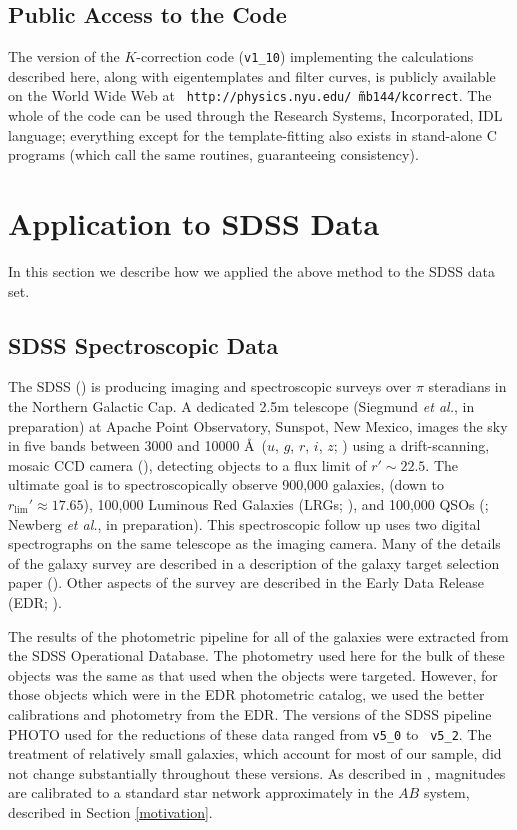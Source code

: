 \documentclass[10pt,preprint]{aastex}
\newcommand{\kversion}{{\tt v1\_10}}
\begin{document}
\subsection{Public Access to the Code}

The version of the $K$-correction code (\kversion) implementing the
calculations described here, along with eigentemplates and filter
curves, is publicly available on the World Wide Web at {\tt
http://physics.nyu.edu/\~\ mb144/kcorrect}.  The whole of the code can
be used through the Research Systems, Incorporated, IDL language;
everything except for the template-fitting also exists in stand-alone
C programs (which call the same routines, guaranteeing consistency).

\section{Application to SDSS Data}
\label{data}

In this section we describe how we applied the above method to the
SDSS data set.

\subsection{SDSS Spectroscopic Data}

The SDSS (\citealt{york00a}) is producing imaging and spectroscopic
surveys over $\pi$ steradians in the Northern Galactic Cap. A
dedicated 2.5m telescope (Siegmund {\it et al.}, in preparation) at
Apache Point Observatory, Sunspot, New Mexico, images the sky in five
bands between 3000 and 10000 \AA\ ($u$, $g$, $r$, $i$, $z$;
\citealt{fukugita96a}) using a drift-scanning, mosaic CCD camera
(\citealt{gunn98a}), detecting objects to a flux limit of $r'\sim
22.5$. The ultimate goal is to spectroscopically observe 900,000
galaxies, (down to $r_{\mathrm{lim}}'\approx 17.65$), 100,000 Luminous
Red Galaxies (LRGs; \citealt{eisenstein01a}), and
100,000 QSOs (\citealt{fan99a}; Newberg {\it et al.}, in preparation).
This spectroscopic follow up uses two digital spectrographs on the
same telescope as the imaging camera. Many of the details of the
galaxy survey are described in a description of the galaxy target
selection paper (\citealt{strauss02a}). Other aspects of the survey
are described in the Early Data Release (EDR;
\citealt{stoughton02a}). 

The results of the photometric pipeline for all of the galaxies were
extracted from the SDSS Operational Database. The photometry used here
for the bulk of these objects was the same as that used when the
objects were targeted. However, for those objects which were in the
EDR photometric catalog, we used the better calibrations and
photometry from the EDR. The versions of the SDSS pipeline PHOTO used
for the reductions of these data ranged from {\tt v5\_0} to {\tt
v5\_2}. The treatment of relatively small galaxies, which account for
most of our sample, did not change substantially throughout these
versions. As described in \citet{smith02a}, magnitudes are calibrated to a
standard star network approximately in the $AB$ system, described in
Section \ref{motivation}.
\end{document}
